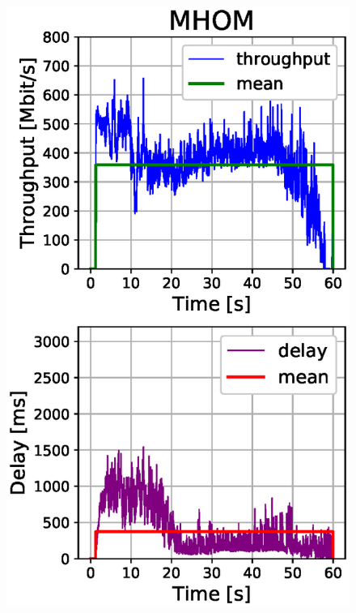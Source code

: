 \documentclass[conference,10pt]{IEEEtran}
\begin{document}
\begin{enumerate}
\begin{figure}[!t]
\begin{center}
\begin{minipage}{.245\textwidth}
		\includegraphics[width=\linewidth, keepaspectratio]{images/results_mho_mean.eps}
		\label{fig:test3}
	\end{minipage}
	\begin{minipage}{.245\textwidth}
		\centering

\end{minipage}
\end{center}
\end{figure}
\end{enumerate}
\end{document}
